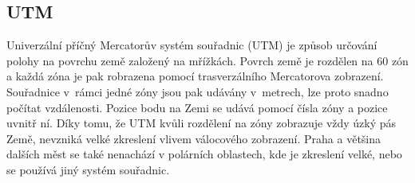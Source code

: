 \subsection{UTM}
Univerzální příčný Mercatorův systém souřadnic (UTM) \cite{UTM} je způsob
určování polohy na povrchu země založený na mřížkách. Povrch země je rozdělen na
60 zón a každá zóna je pak robrazena pomocí trasverzálního Mercatorova
zobrazení. Souřadnice v~rámci jedné zóny jsou pak udávány v~metrech, lze proto
snadno počítat vzdálenosti. Pozice bodu na Zemi se udává pomocí čísla zóny a
pozice uvnitř ní. Díky tomu, že UTM kvůli rozdělení na zóny zobrazuje vždy úzký
pás Země, nevzniká velké zkreslení vlivem válocového zobrazení. Praha a většina
dalších měst se také nenachází v polárních oblastech, kde je zkreslení velké,
nebo se používá jiný systém souřadnic.

